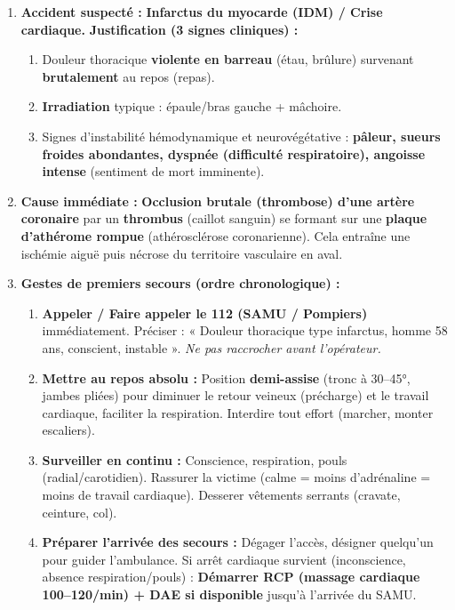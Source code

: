 \documentclass[11pt]{article}
\begin{document}
\begin{corrige}
\begin{enumerate}
    \item \textbf{Accident suspecté :} \textbf{Infarctus du myocarde (IDM) / Crise cardiaque.}
    \textbf{Justification (3 signes cliniques) :}
    \begin{enumerate}
        \item Douleur thoracique \textbf{violente en barreau} (étau, brûlure) survenant \textbf{brutalement} au repos (repas).
        \item \textbf{Irradiation} typique : épaule/bras gauche + mâchoire.
        \item Signes d'instabilité hémodynamique et neurovégétative : \textbf{pâleur, sueurs froides abondantes, dyspnée (difficulté respiratoire), angoisse intense} (sentiment de mort imminente).
    \end{enumerate}
    \item \textbf{Cause immédiate :} \textbf{Occlusion brutale (thrombose) d'une artère coronaire} par un \textbf{thrombus} (caillot sanguin) se formant sur une \textbf{plaque d'athérome rompue} (athérosclérose coronarienne). Cela entraîne une ischémie aiguë puis nécrose du territoire vasculaire en aval.
    \item \textbf{Gestes de premiers secours (ordre chronologique) :}
    \begin{enumerate}
        \item \textbf{Appeler / Faire appeler le 112 (SAMU / Pompiers)} immédiatement. Préciser : « Douleur thoracique type infarctus, homme 58 ans, conscient, instable ». \emph{Ne pas raccrocher avant l'opérateur.}
        \item \textbf{Mettre au repos absolu :} Position \textbf{demi-assise} (tronc à 30--45°, jambes pliées) pour diminuer le retour veineux (précharge) et le travail cardiaque, faciliter la respiration. Interdire tout effort (marcher, monter escaliers).
        \item \textbf{Surveiller en continu :} Conscience, respiration, pouls (radial/carotidien). Rassurer la victime (calme = moins d'adrénaline = moins de travail cardiaque). Desserer vêtements serrants (cravate, ceinture, col).
        \item \textbf{Préparer l'arrivée des secours :} Dégager l'accès, désigner quelqu'un pour guider l'ambulance. Si arrêt cardiaque survient (inconscience, absence respiration/pouls) : \textbf{Démarrer RCP (massage cardiaque 100--120/min) + DAE si disponible} jusqu'à l'arrivée du SAMU.

\end{enumerate}
\end{enumerate}
\end{corrige}
\end{document}
